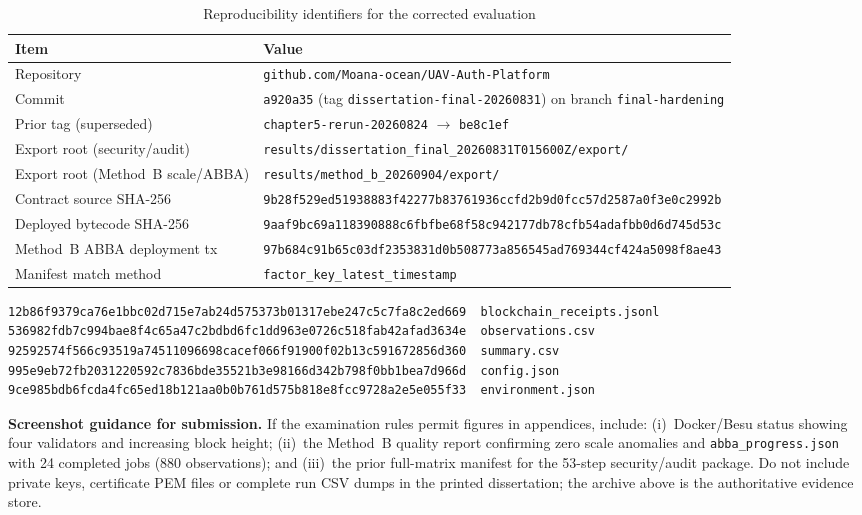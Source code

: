 \begin{table}[htbp]
    \centering
    \caption{Reproducibility identifiers for the corrected evaluation}
    \label{tab:app-repro}
    \small
    \begin{tabular}{|l|p{}|}
        \hline
        \textbf{Item} & \textbf{Value} \\
        \hline
        Repository & \texttt{github.com/Moana-ocean/UAV-Auth-Platform} \\
        \hline
        Commit & \texttt{a920a35} (tag \texttt{dissertation-final-20260831}) on branch \texttt{final-hardening} \\
        \hline
        Prior tag (superseded) & \texttt{chapter5-rerun-20260824} $\rightarrow$ \texttt{be8c1ef} \\
        \hline
        Export root (security/audit) & \texttt{results/dissertation\_final\_20260831T015600Z/export/} \\
        \hline
        Export root (Method~B scale/ABBA) & \texttt{results/method\_b\_20260904/export/} \\
        \hline
        Contract source SHA-256 & \texttt{9b28f529ed51938883f42277b83761936ccfd2b9d0fcc57d2587a0f3e0c2992b} \\
        \hline
        Deployed bytecode SHA-256 & \texttt{9aaf9bc69a118390888c6fbfbe68f58c942177db78cfb54adafbb0d6d745d53c} \\
        \hline
        Method~B ABBA deployment tx & \texttt{97b684c91b65c03df2353831d0b508773a856545ad769344cf424a5098f8ae43} \\
        \hline
        Manifest match method & \texttt{factor\_key\_latest\_timestamp} \\
        \hline
    \end{tabular}
\end{table}

\begin{lstlisting}[style=csv,caption={Per-run checksum file (audit run, step 53)},label=lst:checksums,numbers=none]
12b86f9379ca76e1bbc02d715e7ab24d575373b01317ebe247c5c7fa8c2ed669  blockchain_receipts.jsonl
536982fdb7c994bae8f4c65a47c2bdbd6fc1dd963e0726c518fab42afad3634e  observations.csv
92592574f566c93519a74511096698cacef066f91900f02b13c591672856d360  summary.csv
995e9eb72fb2031220592c7836bde35521b3e98166d342b798f0bb1bea7d966d  config.json
9ce985bdb6fcda4fc65ed18b121aa0b0b761d575b818e8fcc9728a2e5e055f33  environment.json
\end{lstlisting}

\noindent
\textbf{Screenshot guidance for submission.} If the examination rules permit figures in appendices, include: (i)~Docker/Besu status showing four validators and increasing block height; (ii)~the Method~B quality report confirming zero scale anomalies and \texttt{abba\_progress.json} with 24 completed jobs (880 observations); and (iii)~the prior full-matrix manifest for the 53-step security/audit package. Do not include private keys, certificate PEM files or complete run CSV dumps in the printed dissertation; the archive above is the authoritative evidence store.
